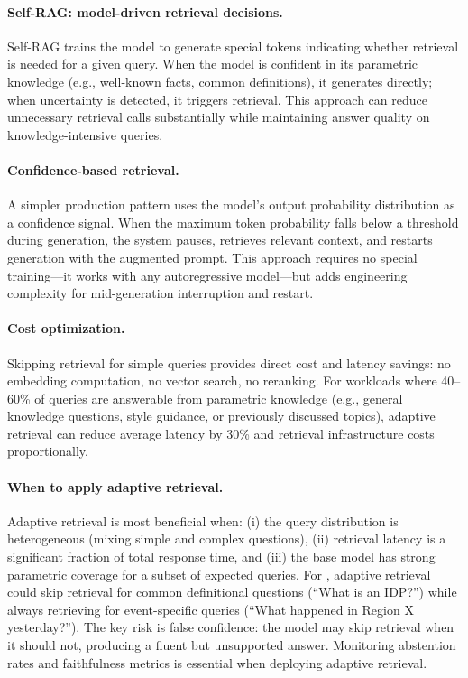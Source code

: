 \paragraph{Self-RAG: model-driven retrieval decisions.}
Self-RAG trains the model to generate special tokens indicating whether retrieval is needed for a given query. When the model is confident in its parametric knowledge (e.g., well-known facts, common definitions), it generates directly; when uncertainty is detected, it triggers retrieval. This approach can reduce unnecessary retrieval calls substantially while maintaining answer quality on knowledge-intensive queries.

\paragraph{Confidence-based retrieval.}
A simpler production pattern uses the model's output probability distribution as a confidence signal. When the maximum token probability falls below a threshold during generation, the system pauses, retrieves relevant context, and restarts generation with the augmented prompt. This approach requires no special training---it works with any autoregressive model---but adds engineering complexity for mid-generation interruption and restart.

\paragraph{Cost optimization.}
Skipping retrieval for simple queries provides direct cost and latency savings: no embedding computation, no vector search, no reranking. For workloads where 40--60\% of queries are answerable from parametric knowledge (e.g., general knowledge questions, style guidance, or previously discussed topics), adaptive retrieval can reduce average latency by 30\% and retrieval infrastructure costs proportionally.

\paragraph{When to apply adaptive retrieval.}
Adaptive retrieval is most beneficial when: (i) the query distribution is heterogeneous (mixing simple and complex questions), (ii) retrieval latency is a significant fraction of total response time, and (iii) the base model has strong parametric coverage for a subset of expected queries. For \ishtar{}, adaptive retrieval could skip retrieval for common definitional questions (``What is an IDP?'') while always retrieving for event-specific queries (``What happened in Region X yesterday?''). The key risk is false confidence: the model may skip retrieval when it should not, producing a fluent but unsupported answer. Monitoring abstention rates and faithfulness metrics is essential when deploying adaptive retrieval.

